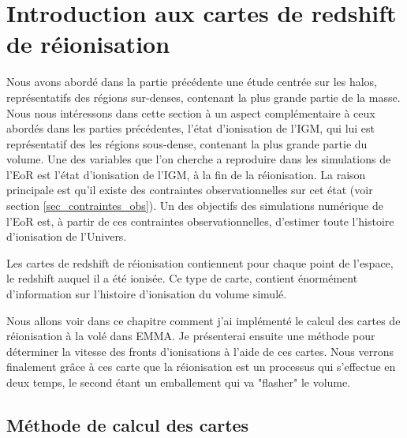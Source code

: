 \chapter{Introduction aux cartes de redshift de réionisation}
\label{sec:intre:zreio}

Nous avons abordé dans la partie précédente une étude centrée sur les halos, représentatifs des régions sur-denses, contenant la plus grande partie de la masse.
Nous nous intéressons dans cette section à un aspect complémentaire à ceux abordés dans les parties précédentes, l'état d'ionisation de l'\ac{IGM}, qui lui est représentatif des les régions sous-dense, contenant la plus grande partie du volume.
Une des variables que l'on cherche a reproduire dans les simulations de l'\ac{EoR} est l'état d'ionisation de l'\ac{IGM}, à la fin de la réionisation.
La raison principale est qu'il existe des contraintes observationnelles sur cet état (voir section \ref{sec_contraintes_obs}).
Un des objectifs des simulations numérique de l'\ac{EoR} est, à partir de ces contraintes observationnelles, d'estimer toute l'histoire d'ionisation de l'Univers.

Les cartes de redshift de réionisation contiennent pour chaque point de l'espace, le redshift auquel il a été ionisée.
Ce type de carte, contient énormément d'information sur l'histoire d'ionisation du volume simulé.

Nous allons voir dans ce chapitre comment j'ai implémenté le calcul des cartes de réionisation à la volé dans EMMA.
Je présenterai ensuite une méthode pour déterminer la vitesse des fronts d’ionisations à l'aide de ces cartes.
Nous verrons finalement grâce à ces carte que la réionisation est un processus qui s'effectue en deux temps, le second étant un emballement qui va "flasher" le volume.




\section{Méthode de calcul des cartes}
\label{sec:zmapcompute}

